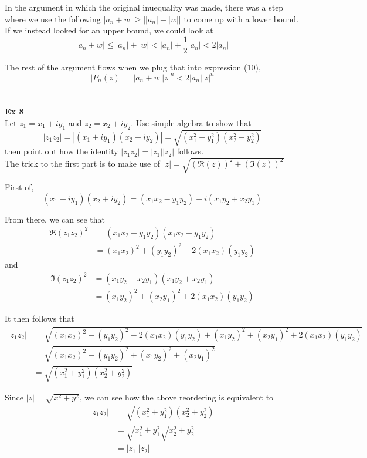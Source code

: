 In the argument in which the original inuequality was made, there was a step where we use the following
$|a_n + w| \geq \left||a_n| - |w|\right|$ to come up with a lower bound.
If we instead looked for an upper bound, we could look at
$$
|a_n + w| \leq |a_n| + |w| < |a_n| + \frac{1}{2}|a_n| < 2|a_n| 
$$

The rest of the argument flows when we plug that into expression (10),
$$
\left| P_n(z) \right| = |a_n + w| |z|^n < 2|a_n||z|^n
$$
\\~\\

\textbf{Ex 8}
\\
Let $z_1 = x_1 + iy_1$ and $z_2 = x_2 + iy_2$.
Use simple algebra to show that
$$
|z_1 z_2| = |(x_1 + iy_1) (x_2 + iy_2)| = \sqrt{ (x_{1}^{2} + y_{1}^{2}) (x_{2}^{2} + y_{2}^{2}) }
$$
then point out how the identity $|z_1 z_2| = |z_1| |z_2|$ follows.
\\

The trick to the first part is to make use of
$|z| = \sqrt{ (\Re(z))^2 + (\Im(z))^2 }$ 

First of,
$$
(x_1 + iy_1) (x_2 + iy_2) = (x_1 x_2 - y_1 y_2) + i (x_1 y_2 + x_2 y_1)
$$

From there, we can see that
\begin{align*}
\Re(z_1 z_2)^2 &= (x_1 x_2 - y_1 y_2) (x_1 x_2 - y_1 y_2) \\
&= (x_1 x_2)^2 + (y_1 y_2)^2 - 2(x_1 x_2)(y_1 y_2)
\end{align*}
and
\begin{align*}
\Im(z_1 z_2)^2 &= (x_1 y_2 + x_2 y_1) (x_1 y_2 + x_2 y_1) \\
&= (x_1 y_2)^2 + (x_2 y_1)^2 + 2(x_1 x_2)(y_1 y_2)
\end{align*}

It then follows that
\begin{align*}
|z_1 z_2| &= \sqrt{ (x_1 x_2)^2 + (y_1 y_2)^2 - 2(x_1 x_2)(y_1 y_2)   +   (x_1 y_2)^2 + (x_2 y_1)^2 + 2(x_1 x_2)(y_1 y_2) } \\
&= \sqrt{ (x_1 x_2)^2 + (y_1 y_2)^2   +  (x_1 y_2)^2 + (x_2 y_1)^2  } \\
&= \sqrt{ (x_{1}^{2} + y_{1}^{2}) (x_{2}^{2} + y_{2}^{2}) }
\end{align*}

Since $|z| = \sqrt{x^2 + y^2}$, we can see how the above reordering is equivalent to
\begin{align*}
|z_1 z_2| &= \sqrt{ (x_{1}^{2} + y_{1}^{2}) (x_{2}^{2} + y_{2}^{2}) } \\
&= \sqrt{ x_{1}^{2} + y_{1}^{2} } \sqrt{ x_{2}^{2} + y_{2}^{2} } \\
&= |z_1| |z_2|
\end{align*}
\\~\\


